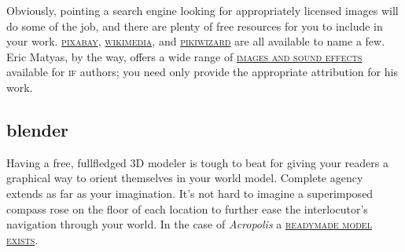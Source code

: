 Obviously, pointing a search engine looking for appropriately licensed images
will do some of the job, and there are plenty of free resources for you to
include in your work. \href{https://pixabay.com/en/photos/}{\textsc{pixabay}},
\href{https://en.wikipedia.org/wiki/Wikipedia:Images}{\textsc{wikimedia}}, and
\href{https://pikwizard.com/}{\textsc{pikiwizard}} are all available to name a
few. Eric Matyas, by the way, offers a wide range of
\href{https://soundimage.org/}{\textsc{images and sound e{ff}ects}} available for
\textsc{if} authors; you need only provide the appropriate attribution for his work.

\subsection{blender}
\noindent Having a free, full\textendash fledged 3D modeler is tough to beat for giving
your readers a graphical way to orient themselves in your world model.
Complete agency extends as far as your imagination. It's not hard to imagine a
super\textendash imposed compass rose on the floor of each location to further
ease the interlocutor's navigation through your world. In the case of \textit{Acropolis} a \href{https://www.blendernation.com/2012/11/30/model-download-acropolis-of-athens-165ad/}{\textsc{ready\textendash made model exists}}.
